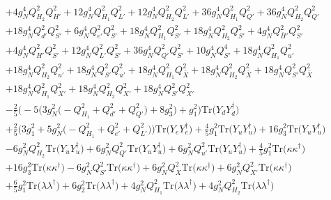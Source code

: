 {\begin{align}
 &+4 g_{N}^{4} Q_{H_2}^{2} Q_{H'}^{2} +12 g_{N}^{4} Q_{H_1}^{2} Q_{L'}^{2} +12 g_{N}^{4} Q_{H_2}^{2} Q_{L'}^{2} +36 g_{N}^{4} Q_{H_1}^{2} Q_{Q'}^{2} +36 g_{N}^{4} Q_{H_2}^{2} Q_{Q'}^{2} \nonumber \\ 
 &+18 g_{N}^{4} Q_{d'}^{2} Q_{S'}^{2} +6 g_{N}^{4} Q_{e'}^{2} Q_{S'}^{2} +18 g_{N}^{4} Q_{H_1}^{2} Q_{S'}^{2} +18 g_{N}^{4} Q_{H_2}^{2} Q_{S'}^{2} +4 g_{N}^{4} Q_{\bar{H}'}^{2} Q_{S'}^{2} \nonumber \\ 
 &+4 g_{N}^{4} Q_{H'}^{2} Q_{S'}^{2} +12 g_{N}^{4} Q_{L'}^{2} Q_{S'}^{2} +36 g_{N}^{4} Q_{Q'}^{2} Q_{S'}^{2} +10 g_{N}^{4} Q_{S'}^{4} +18 g_{N}^{4} Q_{H_1}^{2} Q_{u'}^{2} \nonumber \\ 
 &+18 g_{N}^{4} Q_{H_2}^{2} Q_{u'}^{2} +18 g_{N}^{4} Q_{S'}^{2} Q_{u'}^{2} +18 g_{N}^{4} Q_{H_1}^{2} Q_{\bar{X}}^{2} +18 g_{N}^{4} Q_{H_2}^{2} Q_{\bar{X}}^{2} +18 g_{N}^{4} Q_{S'}^{2} Q_{\bar{X}}^{2} \nonumber \\ 
 &+18 g_{N}^{4} Q_{H_1}^{2} Q_{X'}^{2} +18 g_{N}^{4} Q_{H_2}^{2} Q_{X'}^{2} +18 g_{N}^{4} Q_{S'}^{2} Q_{X'}^{2} \nonumber \\ 
 &-\frac{2}{5} \Big(-5 \Big(3 g_{N}^{2} \Big(- Q_{H_1}^{2}  + Q_{d'}^{2} + Q_{Q'}^{2}\Big) + 8 g_{3}^{2} \Big) + g_{1}^{2}\Big)\mbox{Tr}\Big({Y_d  Y_{d}^{\dagger}}\Big) \nonumber \\ 
 &+\frac{2}{5} \Big(3 g_{1}^{2}  + 5 g_{N}^{2} \Big(- Q_{H_1}^{2}  + Q_{e'}^{2} + Q_{L'}^{2}\Big)\Big)\mbox{Tr}\Big({Y_e  Y_{e}^{\dagger}}\Big) +\frac{4}{5} g_{1}^{2} \mbox{Tr}\Big({Y_u  Y_{u}^{\dagger}}\Big) +16 g_{3}^{2} \mbox{Tr}\Big({Y_u  Y_{u}^{\dagger}}\Big) \nonumber \\ 
 &-6 g_{N}^{2} Q_{H_2}^{2} \mbox{Tr}\Big({Y_u  Y_{u}^{\dagger}}\Big) +6 g_{N}^{2} Q_{Q'}^{2} \mbox{Tr}\Big({Y_u  Y_{u}^{\dagger}}\Big) +6 g_{N}^{2} Q_{u'}^{2} \mbox{Tr}\Big({Y_u  Y_{u}^{\dagger}}\Big) +\frac{4}{5} g_{1}^{2} \mbox{Tr}\Big({\kappa  \kappa^{\dagger}}\Big) \nonumber \\ 
 &+16 g_{3}^{2} \mbox{Tr}\Big({\kappa  \kappa^{\dagger}}\Big) -6 g_{N}^{2} Q_{S'}^{2} \mbox{Tr}\Big({\kappa  \kappa^{\dagger}}\Big) +6 g_{N}^{2} Q_{\bar{X}}^{2} \mbox{Tr}\Big({\kappa  \kappa^{\dagger}}\Big) +6 g_{N}^{2} Q_{X'}^{2} \mbox{Tr}\Big({\kappa  \kappa^{\dagger}}\Big) \nonumber \\ 
 &+\frac{6}{5} g_{1}^{2} \mbox{Tr}\Big({\lambda  \lambda^{\dagger}}\Big) +6 g_{2}^{2} \mbox{Tr}\Big({\lambda  \lambda^{\dagger}}\Big) +4 g_{N}^{2} Q_{H_1}^{2} \mbox{Tr}\Big({\lambda  \lambda^{\dagger}}\Big) +4 g_{N}^{2} Q_{H_2}^{2} \mbox{Tr}\Big({\lambda  \lambda^{\dagger}}\Big) \nonumber \\ 

\end{align}}
